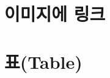 \documentclass[12pt, a4paper, oneside]{book}
\let\stdsection\section
\renewcommand\section{\newpage\stdsection}
\begin{document}
				\section{이미지에 링크}
%			
%			
%			
%			
				\section{표(Table)}
				
\end{document}

